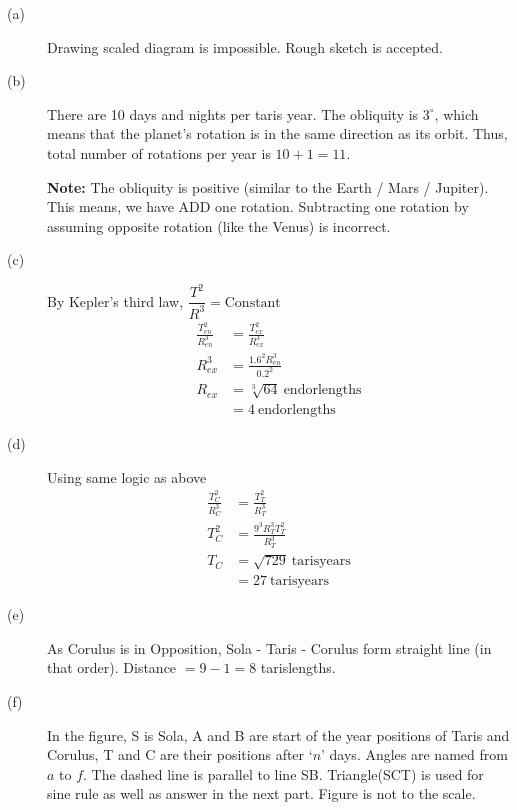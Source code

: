 \begin{description}
\item[(a)] Drawing scaled diagram is impossible. Rough sketch is accepted.
\item[(b)] There are 10 days and nights per taris year. The obliquity is
  $3^\circ$, which means that the planet's rotation is in the same direction
  as its orbit. Thus, total number of rotations per year is $10 + 1 = 11$.

  \textbf{Note:} The obliquity is positive (similar to the Earth / Mars /
  Jupiter). This means, we have ADD one rotation. Subtracting one rotation by
  assuming opposite rotation (like the Venus) is incorrect.
\item[(c)] By Kepler's third law, $\dfrac{T^2}{R^3} = \text{Constant}$
  \begin{align*}
  \frac{T_{en}^2}{R_{en}^3} &= \frac{T_{ex}^2}{R_{ex}^3} \tag{1}\\
  R_{ex}^3 &= \frac{1.6^2 R_{en}^3}{0.2^2} \tag{2}\\
  R_{ex} &= \sqrt[3]{64}\ \text{endorlengths} \tag{3}\\
         &= 4\ \text{endorlengths} \tag{4}
  \end{align*}
\item[(d)] Using same logic as above
  \begin{align*}
  \frac{T_C^2}{R_C^3} &= \frac{T_T^2}{R_T^3} \tag{5}\\
  T_C^2 &= \frac{9^3 R_T^3 T_T^2}{R_T^3} \tag{6}\\
  T_C &= \sqrt{729}\ \text{tarisyears} \tag{7}\\
      &= 27\ \text{tarisyears} \tag{8}
  \end{align*}
\item[(e)] As Corulus is in Opposition, Sola - Taris - Corulus form straight
  line (in that order). Distance $= 9 - 1 = 8$ tarislengths.
\item[(f)] In the figure, S is Sola, A and B are start of the year positions
  of Taris and Corulus, T and C are their positions after `$n$' days. Angles
  are named from $a$ to $f$. The dashed line is parallel to line SB.
  Triangle(SCT) is used for sine rule as well as answer in the next part.
  Figure is not to the scale.

\end{description}
